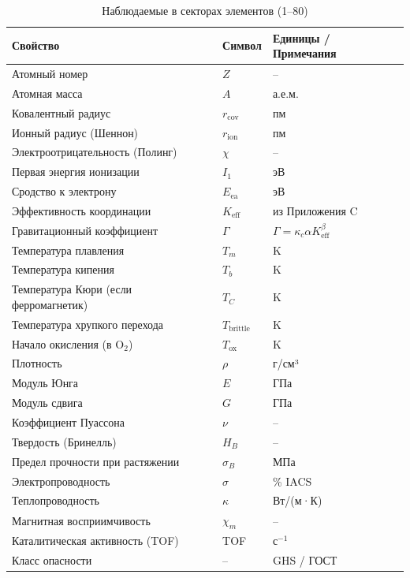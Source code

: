 \documentclass[12pt,a4paper]{article}
\newcommand{\Keff}{K_{\mathrm{eff}}}
\newcommand{\Gcoeff}{\Gamma}
\begin{document}
	\begin{longtable}{p{4cm} p{3cm} p{8cm}}
		\caption{Наблюдаемые в секторах элементов (1–80)} \\
		\toprule
		\textbf{Свойство} & \textbf{Символ} & \textbf{Единицы / Примечания} \\
		\midrule
		Атомный номер & \(Z\) & – \\
		Атомная масса & \(A\) & а.е.м. \\
		Ковалентный радиус & \(r_{\text{cov}}\) & пм \\
		Ионный радиус (Шеннон) & \(r_{\text{ion}}\) & пм \\
		Электроотрицательность (Полинг) & \(\chi\) & – \\
		Первая энергия ионизации & \(I_1\) & эВ \\
		Сродство к электрону & \(E_{\text{ea}}\) & эВ \\
		Эффективность координации & \(\Keff\) & из Приложения C \\
		Гравитационный коэффициент & \(\Gcoeff\) & \(\Gcoeff = \kappa_c \alpha \Keff^{\beta}\) \\
		Температура плавления & \(T_m\) & K \\
		Температура кипения & \(T_b\) & K \\
		Температура Кюри (если ферромагнетик) & \(T_C\) & K \\
		Температура хрупкого перехода & \(T_{\text{brittle}}\) & K \\
		Начало окисления (в O\(_{2}\)) & \(T_{\text{ox}}\) & K \\
		Плотность & \(\rho\) & г/см³ \\
		Модуль Юнга & \(E\) & ГПа \\
		Модуль сдвига & \(G\) & ГПа \\
		Коэффициент Пуассона & \(\nu\) & – \\
		Твердость (Бринелль) & \(H_B\) & – \\
		Предел прочности при растяжении & \(\sigma_B\) & МПа \\
		Электропроводность & \(\sigma\) & \% IACS \\
		Теплопроводность & \(\kappa\) & Вт/(м·К) \\
		Магнитная восприимчивость & \(\chi_m\) & – \\
		Каталитическая активность (TOF) & TOF & с\(^{-1}\) \\
		Класс опасности & – & GHS / ГОСТ \\
		\bottomrule
	\end{longtable}
	
\end{document}
